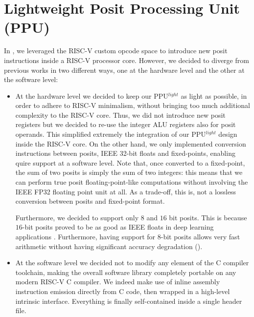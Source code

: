 \section{Lightweight Posit Processing Unit (PPU)}

In \cite{ppulight}, we leveraged the RISC-V custom opcode space to introduce new posit instructions inside a RISC-V processor core.
However, we decided to diverge from previous works in two different ways, one at the hardware level and the other at the software level:
\begin{itemize}
    \item At the hardware level we decided to keep our PPU$^{light}$ as light as possible, in order to adhere to RISC-V minimalism, without bringing too much additional complexity to the RISC-V core. Thus, we did not introduce new posit registers but we decided to re-use the integer ALU registers also for posit operands. This simplified extremely the integration of our PPU$^{light}$ design inside the RISC-V core. On the other hand, we only implemented conversion instructions between posits, IEEE 32-bit floats  and fixed-points, enabling quire support at a software level. Note that, once converted to a fixed-point, the sum of two posits is simply the sum of two integers: this means that we can perform true posit floating-point-like computations without involving the IEEE FP32 floating point unit at all. As a trade-off, this is, not a lossless conversion between posits and fixed-point format.
    
    Furthermore, we decided to support only $8$ and $16$ bit posits. This is because $16$-bit posits proved to be as good as IEEE floats in deep learning applications \cite{deeppositron,positnn,9066876}. Furthermore, having support for $8$-bit posits allows very fast arithmetic without having significant accuracy degradation (\cite{coco_et_al_ieeespm_2020,coco2020sensors}).
    \item At the software level we decided not to modify any element of the C compiler toolchain, making the overall software library completely portable on any modern RISC-V C compiler. We indeed make use of inline assembly instruction emission directly from C code, then wrapped in a high-level intrinsic interface. Everything is finally self-contained inside a single header file.
\end{itemize}

